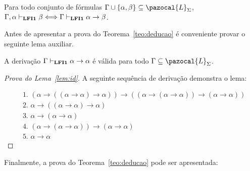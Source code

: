     
    
    \begin{teorema}
        \label{teo:deducao}
        Para todo conjunto de fórmulas $\Gamma \cup \{\alpha, \beta \} \subseteq \pazocal{L}_{\Sigma}$, $\Gamma, \alpha \vdash_{\textbf{LFI1}{}} \beta \Longleftrightarrow \Gamma \vdash_{\textbf{LFI1}{}} \alpha \to \beta$.
    \end{teorema}
    
    \noindent Antes de apresentar a prova do Teorema~\ref{teo:deducao} é conveniente provar o seguinte lema auxiliar.
    
    \begin{lema}
        \label{lem:id}
        A derivação $\Gamma \vdash_{\textbf{LFI1}{}} \alpha \to \alpha$ é válida para todo $\Gamma \subseteq \pazocal{L}_{\Sigma}$.
    \end{lema}
    
    \begin{proof}[Prova do Lema~\ref{lem:id}]
        A seguinte sequência de derivação demonstra o lema:
        
        \begin{align*}
            & \text{1. } (\alpha \to ((\alpha \to \alpha) \to \alpha)) \to ((\alpha \to (\alpha \to \alpha)) \to (\alpha \to \alpha))\tag{Ax2}\\
            & \text{2. } \alpha \to ((\alpha \to \alpha) \to \alpha)\tag{Ax1}\\
            & \text{3. } \alpha \to (\alpha \to \alpha)\tag{Ax1}\\
            & \text{4. } (\alpha \to (\alpha \to \alpha)) \to (\alpha \to \alpha)\tag{MP 1,2}\\
            & \text{5. } \alpha \to \alpha\tag{MP 4,3}
        \end{align*}
    \end{proof}

    \noindent Finalmente, a prova do Teorema~\ref{teo:deducao} pode ser apresentada:

